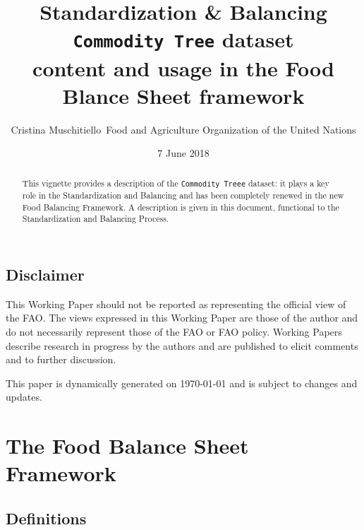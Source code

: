 \documentclass[]{article}
\title{Standardization \& Balancing\\
\texttt{Commodity\ Tree} dataset\\
\hspace*{0.333em}content and usage in the Food Blance Sheet framework}
\author{Cristina Muschitiello~Food and Agriculture Organization of the United
Nations}
\date{7 June 2018}
\begin{document}
\maketitle
\begin{abstract}
This vignette provides a description of the \texttt{Commodity\ Treee}
dataset: it plays a key role in the Standardization and Balancing and
has been completely renewed in the new Food Balancing Framework. A
description is given in this document, functional to the Standardization
and Balancing Process.
\end{abstract}

{
\setcounter{tocdepth}{4}
\tableofcontents
}
\newpage

\listoftables

\listoffigures

\newpage

\subsection*{Disclaimer}\label{disclaimer}

This Working Paper should not be reported as representing the official
view of the FAO. The views expressed in this Working Paper are those of
the author and do not necessarily represent those of the FAO or FAO
policy. Working Papers describe research in progress by the authors and
are published to elicit comments and to further discussion.

This paper is dynamically generated on \today{} and is subject to
changes and updates.

\section*{The Food Balance Sheet
Framework}\label{the-food-balance-sheet-framework}

\subsection*{Definitions}\label{definitions}
\end{document}
